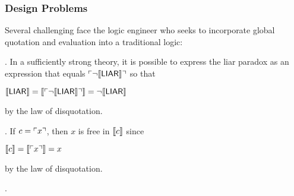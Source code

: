 \documentclass[t,12pt,numbers,fleqn]{beamer}
\begin{document}

\begin{frame}
\frametitle{Design Problems}

Several challenging  face the logic engineer
who seeks to incorporate global quotation and evaluation into a
traditional logic:

\be

  \item {}.  In a sufficiently strong theory,
    it is possible to express the liar paradox as an expression
     that equals $\ulcorner\neg\llbracket\mbox{\sf LIAR}\rrbracket\urcorner$
    so that

  \bi

    \item[] $\llbracket\mbox{\sf LIAR}\rrbracket =
      \llbracket\ulcorner\neg\llbracket\mbox{\sf LIAR}\rrbracket\urcorner\rrbracket = \neg\llbracket\mbox{\sf LIAR}\rrbracket$

  \ei

  by the law of disquotation. 

  \item {}.  If $c = \ulcorner x\urcorner$, then $x$ is
    free in $\llbracket c\rrbracket$ since

  \bi

    \item[] $\llbracket c\rrbracket = \llbracket\ulcorner x\urcorner\rrbracket = x$

  \ei

  by the law of disquotation.

  \item {}

  \item {}.

\ee
\end{frame}

\end{document}
